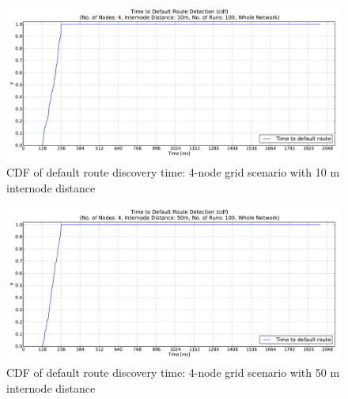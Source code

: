 \begin{figure}[h]
  \begin{center}
  \vspace{-10pt}
    \leavevmode
      \includegraphics[scale=0.38]
      {Pics/results/4/MRHOF/grid/dist10_montecarlo_cdf_hist.pdf}
   \caption{CDF of default route discovery time: 4-node grid scenario with 10 m internode distance}
   \label{fig:4_MRHOF_grid_10_cdf}
  \end{center}
\end{figure}

\begin{figure}[htpb]
  \begin{center}
  \vspace{-20pt}
    \leavevmode
      \includegraphics[scale=0.38]
      {Pics/results/4/MRHOF/grid/dist50_montecarlo_cdf_hist.pdf}
   \caption{CDF of default route discovery time: 4-node grid scenario with 50 m internode distance}
   \label{fig:4_MRHOF_grid_50_cdf}
  \end{center}
\end{figure}

